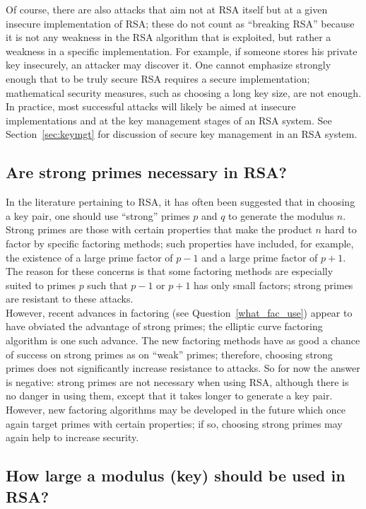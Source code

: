 Of course, there are also attacks that aim not at RSA itself but at a
given insecure implementation of RSA; these do not count as ``breaking
RSA'' because it is not any weakness in the RSA algorithm that is
exploited, but rather a weakness in a specific implementation. For
example, if someone stores his private key insecurely, an attacker may
discover it. One cannot emphasize strongly enough that to be truly
secure RSA requires a secure implementation; mathematical security
measures, such as choosing a long key size, are not enough. In
practice, most successful attacks will likely be aimed at insecure
implementations and at the key management stages of an RSA system. See
Section~\ref{sec:keymgt} for discussion of secure key management in an RSA
system.

\subsection{Are strong primes necessary in RSA?}

In the literature pertaining to RSA, it has often been suggested that
in choosing a key pair, one should use ``strong'' primes $p$ and $q$ to
generate the modulus $n$. Strong primes are those with certain properties
that make the product $n$ hard to factor by specific factoring methods;
such properties have included, for example, the existence of a large
prime factor of $p-1$ and a large prime factor of $p+1$. The reason for
these concerns is that some factoring methods are especially suited to
primes $p$ such that $p-1$ or $p+1$ has only small factors; strong primes
are resistant to these attacks.\\

However, recent advances in factoring (see Question~\ref{what_fac_use})
appear to have obviated the advantage of strong primes; the elliptic curve
factoring algorithm is one such advance. The new factoring methods have as
good a chance of success on strong primes as on ``weak'' primes; therefore,
choosing strong primes does not significantly increase resistance to
attacks. So for now the answer is negative: strong primes are not necessary
when using RSA, although there is no danger in using them, except that it
takes longer to generate a key pair. However, new factoring algorithms may
be developed in the future which once again target primes with certain
properties; if so, choosing strong primes may again help to increase
security.

\subsection{How large a modulus (key) should be used in RSA?}

